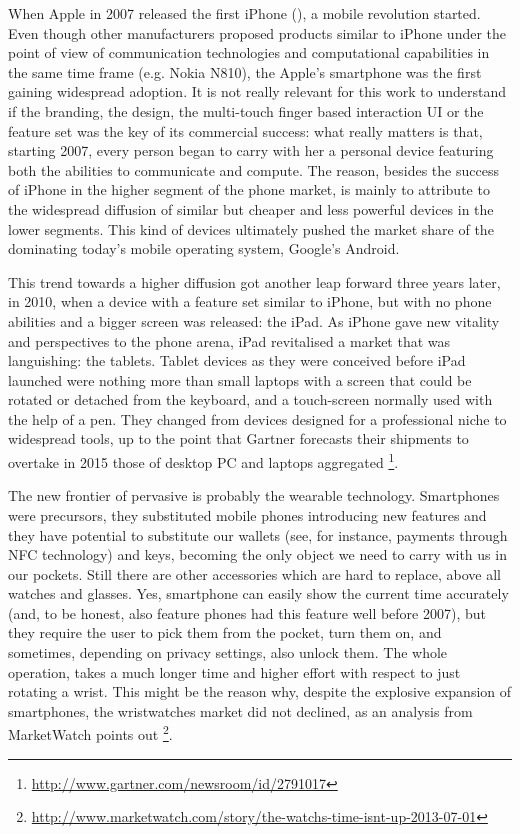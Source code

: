\documentclass[12pt,a4paper,twoside,openright]{book}
\begin{document}
When Apple in 2007 released the first iPhone (), a mobile revolution started.
%
Even though other manufacturers proposed products similar to iPhone under the point of view of communication technologies and computational capabilities in the same time frame (e.g. Nokia N810), the Apple's smartphone was the first gaining widespread adoption.
%
It is not really relevant for this work to understand if the branding, the design, the multi-touch finger based interaction UI or the feature set was the key of its commercial success: what really matters is that, starting 2007, every person began to carry with her a personal device featuring both the abilities to communicate and compute.
%
The reason, besides the success of iPhone in the higher segment of the phone market, is mainly to attribute to the widespread diffusion of similar but cheaper and less powerful devices in the lower segments.
%
This kind of devices ultimately pushed the market share of the dominating today's mobile operating system, Google's Android.

This trend towards a higher diffusion got another leap forward three years later, in 2010, when a device with a feature set similar to iPhone, but with no phone abilities  and a bigger screen was released: the iPad.
%
As iPhone gave new vitality and perspectives to the phone arena, iPad revitalised a market that was languishing: the tablets.
%
Tablet devices as they were conceived before iPad launched were nothing more than small laptops with a screen that could be rotated or detached from the keyboard, and a touch-screen normally used with the help of a pen.
%
They changed from devices designed for a professional niche to widespread tools, up to the point that Gartner forecasts their shipments to overtake in 2015 those of desktop PC and laptops aggregated \footnote{\url{http://www.gartner.com/newsroom/id/2791017}}.

The new frontier of pervasive is probably the wearable technology. Smartphones were precursors, they substituted mobile phones introducing new features and they have potential to substitute our wallets (see, for instance, payments through NFC technology) and keys, becoming the only object we need to carry with us in our pockets.
%
Still there are other accessories which are hard to replace, above all watches and glasses.
%
Yes, smartphone can easily show the current time accurately (and, to be honest, also feature phones had this feature well before 2007), but they require the user to pick them from the pocket, turn them on, and sometimes, depending on privacy settings, also unlock them.
%
The whole operation, takes a much longer time and higher effort with respect to just rotating a wrist.
%
This might be the reason why, despite the explosive expansion of smartphones, the wristwatches market did not declined, as an analysis from MarketWatch points out \footnote{\url{http://www.marketwatch.com/story/the-watchs-time-isnt-up-2013-07-01}}.
\end{document}
